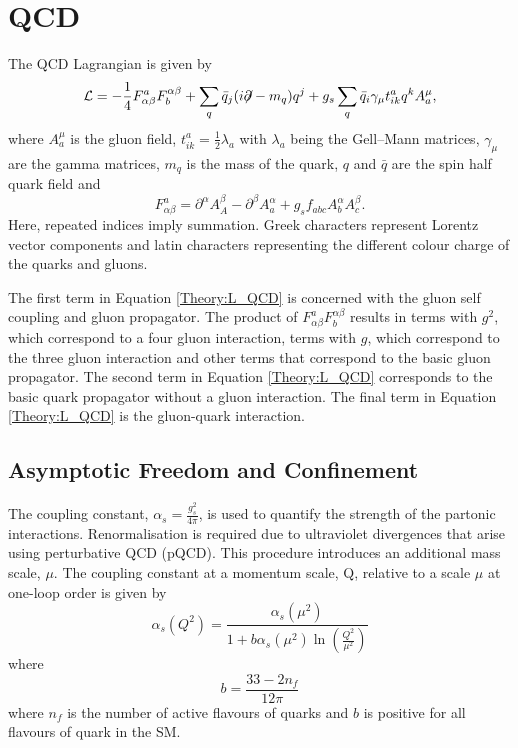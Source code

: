 \section{QCD}
\label{Theory:QCD}
The QCD Lagrangian is given by 
\begin{equation}
\mathcal{L} = - \frac{1}{4} F^{a}_{\alpha\beta} F_{b}^{\alpha\beta} + \sum_{q} \bar{q}_{j}( i{\not}\partial - m_{q})q^{j}  + g_s\sum_{q} \bar{q}_{i}\gamma_{\mu} t^{a}_{ik} q^{k} A^{\mu}_{a}, 
\label{Theory:L_QCD}
\end{equation}
where $A^{\mu}_{a}$ is the gluon field, $t^{a}_{ik}=\frac{1}{2}\lambda_{a}$ with $\lambda_{a}$ being the Gell--Mann matrices, $\gamma_{\mu}$ are the gamma matrices, $m_{q}$ is the mass of the quark, $q$ and $\bar{q}$ are the spin half quark field and 
\begin{equation}
F^{a}_{\alpha\beta} = \partial^{\alpha}A_{A}^{\beta} - \partial^{\beta}A_{a}^{\alpha} + g_s f_{abc} A_{b}^{\alpha}A_{c}^{\beta}. 
\label{Theory:F_Tensor}
\end{equation}
Here, repeated indices imply summation. 
Greek characters represent Lorentz vector components and latin characters representing the different colour charge of the quarks and gluons. 

The first term in Equation \ref{Theory:L_QCD} is concerned with the gluon self coupling and gluon propagator. 
The product of $F^{a}_{\alpha\beta} F_{b}^{\alpha\beta}$ results in terms with $g^2$, which correspond to a four gluon interaction, terms with $g$, which correspond to the three gluon interaction and other terms that correspond to the basic gluon propagator.
The second term in Equation \ref{Theory:L_QCD} corresponds to the basic quark propagator without a gluon interaction.
The final term in Equation \ref{Theory:L_QCD} is the gluon-quark interaction.

\subsection{Asymptotic Freedom and Confinement}


The coupling constant, $\alpha_{s} = \frac{g_s^2}{4\pi}$, is used to quantify the strength of the partonic interactions.
Renormalisation is required due to ultraviolet divergences that arise using perturbative QCD (pQCD). 
This procedure introduces an additional mass scale, $\mu$.
The coupling constant at a momentum scale, Q, relative to a scale $\mu$ at one-loop order is given by
\begin{equation}
\alpha_{s}(Q^2) = \frac{\alpha_{s}(\mu^2)}{1+b\alpha_{s}(\mu^2)\ln(\frac{Q^2}{\mu^2})}
\label{Theory:Coupling}
\end{equation}
where 
\begin{equation}
b = \frac{33-2n_f}{12\pi}
\label{Theory:b_Coupling}
\end{equation}
where $n_f$ is the number of active flavours of quarks and $b$ is positive for all flavours of quark in the SM.

